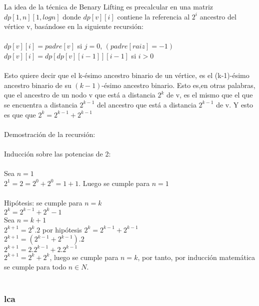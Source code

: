 \documentclass[12pt]{article}
\begin{document}



La idea de la t\'ecnica de Benary Lifting es precalcular en una matriz $dp [1, n] [1, log n]$ donde $dp [v] [i]$  contiene la referencia al $2^i$ ancestro del v\'ertice v,  bas\'andose en la siguiente recursi\'on:\\
\\
                       $dp[v] [i] = padre[v]$ si $j = 0$, $(padre[raiz]=-1)$\\
                       $dp[v] [i] = dp [dp[v] [i - 1]] [i - 1]$ si $i > 0$\\
\\
Esto quiere decir que el k-\'esimo ancestro binario de un v\'ertice, es el (k-1)-\'esimo  ancestro binario de su $(k-1)$-\'esimo ancestro binario. Esto es,en otras palabras, que el ancestro  de un nodo v que est\'a a distancia $2^k$ de v, es el mismo que el que se encuentra a distancia $2^{k-1}$ del ancestro que est\'a a distancia $2^{k-1}$ de v. Y esto es que que 
$2^k = 2^{k-1} + 2^{k-1}$\\
\\ 

Demostraci\'on de la recursi\'on:\\
\\
Inducci\'on sobre las potencias de 2:\\
\\
Sea $n = 1$\\
$2^1 = 2 = 2^0 + 2^0 = 1 + 1$. Luego se cumple para $n = 1$\\
\\
Hip\'otesis: se cumple para $n = k$\\
                            $2^k = 2^{k-1} + 2^k-1$ \\
Sea $n = k + 1$\\ 
    $2^{k+1} = 2^k . 2$ por hip\'otesis $2^k = 2^{k-1} + 2 ^{k-1}$\\
    $2^{k+1} = (2^{k-1} + 2^{k-1}) . 2$\\
    $2^{k+1} = 2.2^{k-1} + 2.2^{k-1}$\\
    $2^{k+1} = 2^k + 2^k$, luego se cumple para $n=k$, por tanto, por inducci\'on matem\'atica se cumple para todo $n \in N$.\\
\\







\subsubsection{\textbf{lca}}
\end{document}
